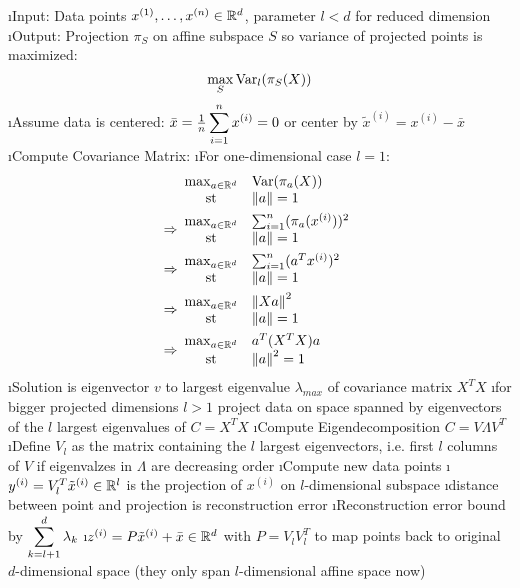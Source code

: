 \be
\i Input: Data points $x^{(1)}, \ldots, x^{(n)} \in \mathbb{R}^d$, parameter $l < d$ for reduced dimension
\i Output: Projection $\pi_S$ on affine subspace $S$ so variance of projected points is maximized: \[
\max_S \text{Var}_l(\pi_S(X))
\]
\i Assume data is centered: $\bar x = \frac{1}{n} \displaystyle\sum^n_{{i}=1} x^{(i)} = 0$ or center by $\tilde x^{(i)} = x^{(i)} - \bar x$
\i Compute Covariance Matrix:
\bi
\i For one-dimensional case $l=1$:
\begin{align*}
&
\begin{array}{cl}
\max_{a \in \mathbb{R}^d} & \text{Var}(\pi_a(X)) \\
\text{st} & \left\lVert a\right\rVert = 1
\end{array} \\
\Rightarrow&
\begin{array}{cl}
\max_{a \in \mathbb{R}^d} & \sum_{i=1}^n (\pi_a(x^{(i)}))^2\\
\text{st} & \left\lVert a\right\rVert = 1
\end{array} \\
\Rightarrow&
\begin{array}{cl}
\max_{a \in \mathbb{R}^d} & \sum_{i=1}^n (a^Tx^{(i)})^2\\
\text{st} & \left\lVert a\right\rVert = 1
\end{array} \\
\Rightarrow&
\begin{array}{cl}
\max_{a \in \mathbb{R}^d} & \left\lVert Xa\right\rVert^2\\
\text{st} & \left\lVert a\right\rVert = 1
\end{array} \\
\Rightarrow&
\begin{array}{cl}
\max_{a \in \mathbb{R}^d} & a^T(X^TX)a\\
\text{st} & \left\lVert a\right\rVert^2 = 1
\end{array} \\
\end{align*}
\i Solution is eigenvector $v$ to largest eigenvalue $\lambda_{max}$ of covariance matrix $X^TX$
\i for bigger projected dimensions $l > 1$ project data on space spanned by eigenvectors of the $l$ largest eigenvalues of $C = X^TX$
\ei
\i Compute Eigendecomposition $C = V \Lambda V^T$
\i Define $V_l$ as the matrix containing the $l$ largest eigenvectors, i.e. first $l$ columns of $V$ if eigenvalzes in $\Lambda$ are decreasing order
\i Compute new data points 
\bi
\i $y^{(i)} = V_l^T \tilde x^{(i)} \in \mathbb{R}^l$ is the projection of $x^{(i)}$ on $l$-dimensional subspace
\bi
\i distance between point and projection is reconstruction error
\i Reconstruction error bound by $\displaystyle\sum_{k=l+1}^d \lambda_k$
\ei
\i $z^{(i)} = P \tilde x^{(i)} + \bar x \in \mathbb{R}^d$ with $P = V_l V_l^T$ to map points back to original $d$-dimensional space (they only span $l$-dimensional affine space now)
\ei
\ee

